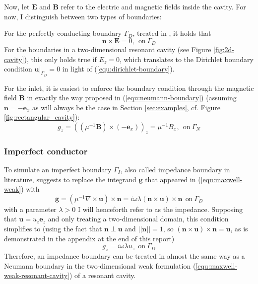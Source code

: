 \documentclass[11pt, a4paper]{article}
\begin{document}
Now, let $\mathbf{E}$ and $\mathbf{B}$ refer to the electric and magnetic fields inside
the cavity. For now, I distinguish between two types of boundaries:

For the perfectly conducting boundary $\Gamma_D$, treated in \citep{monk}, it holds that
\begin{equation}
    \mathbf{n} \times \mathbf{E} = 0,~~\text{on}~\Gamma_D \label{equ:perfect-conductor-boundary}
\end{equation}
For the boundaries in a two-dimensional resonant cavity (see Figure 
\ref{fig:2d-cavity}), this only holds true if $E_z = 0$, which translates
to the Dirichlet boundary condition $\left.\mathbf{u}\right|_{\Gamma_D} = 0$
in light of (\ref{equ:dirichlet-boundary}).

For the inlet, it is easiest to enforce the boundary condition through the
magnetic field $\mathbf{B}$ in exactly the way proposed in
(\ref{equ:neumann-boundary}) (assuming $\mathbf{n} = -\mathbf{e}_x$ as
will always be the case in Section \ref{sec:examples}, cf. Figure \ref{fig:rectangular_cavity}):
\begin{equation}
    g_z = (({\mu^{-1} \mathbf{B}}) \times (-\mathbf{e}_x))_z = \mu^{-1} B_x,~~\text{on}~\Gamma_N
\end{equation}

\subsubsection{Imperfect conductor}
\label{subsubsec:impedance}

To simulate an imperfect boundary $\Gamma_I$, also called impedance boundary in literature, 
\cite{monk} suggests to replace the integrand $\mathbf{g}$ that appeared in 
(\ref{equ:maxwell-weak}) with
\begin{equation}
    \mathbf{g} = (\mu^{-1} \nabla \times \mathbf{u}) \times \mathbf{n}
    = i \omega \lambda (\mathbf{n} \times \mathbf{u}) \times \mathbf{n}~~\text{on}~\Gamma_D
\end{equation}
with a parameter $\lambda>0$ I will henceforth refer to as the impedance.
Supposing that $\mathbf{u} = u_z \mathbf{e}_z$ and only treating a
two-dimensional domain, this condition simplifies to (using the fact that $\mathbf{n} \perp \mathbf{u}$
and $||\mathbf{n}|| = 1$, so $(\mathbf{n} \times \mathbf{u}) \times \mathbf{n} = \mathbf{u}$,
as is demonstrated in the appendix at the end of this report)
\begin{equation}
    g_z = i \omega \lambda u_z~~\text{on}~\Gamma_D
\end{equation}
Therefore, an impedance boundary can be treated in almost the same way as a
Neumann boundary in the two-dimensional weak formulation (\ref{equ:maxwell-weak-resonant-cavity})
of a resonant cavity.
\end{document}
